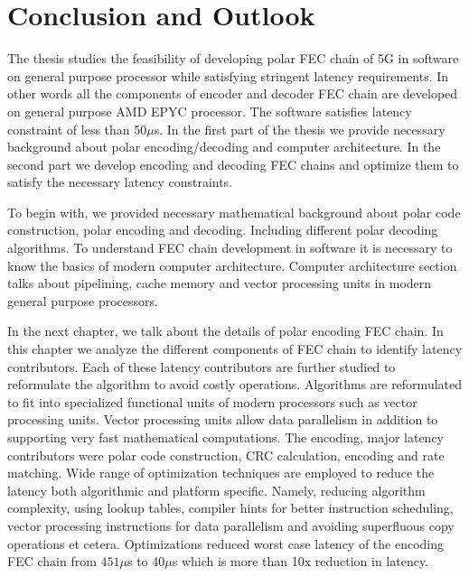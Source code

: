 \chapter{Conclusion and Outlook} \label{chap:conclusion}
The thesis studies the feasibility of developing polar FEC chain of 5G in software on general purpose processor while satisfying stringent latency requirements. In other words all the components of encoder and decoder FEC chain are developed on general purpose AMD EPYC processor. The software satisfies latency constraint of less than 50$\mu$s. In the first part of the thesis we provide necessary background about polar encoding/decoding and computer architecture. In the second part we develop encoding and decoding FEC chains and optimize them to satisfy the necessary latency constraints. \newline

To begin with, we provided necessary mathematical background about polar code construction, polar encoding and decoding. Including different polar decoding algorithms. To understand FEC chain development in software it is necessary to know the basics of modern computer architecture. Computer architecture section talks about pipelining, cache memory and vector processing units in modern general purpose processors. \newline

In the next chapter, we talk about the details of polar encoding FEC chain. In this chapter we analyze the different components of FEC chain to identify latency contributors. Each of these latency contributors are further studied to reformulate the algorithm to avoid costly operations. Algorithms are reformulated to fit into specialized functional units of modern processors such as vector processing units. Vector processing units allow data parallelism in addition to supporting very fast mathematical computations. The encoding,  major latency contributors were polar code construction, CRC calculation, encoding and rate matching. Wide range of optimization techniques are employed to reduce the latency both algorithmic and platform specific. Namely, reducing algorithm complexity, using lookup tables, compiler hints for better instruction scheduling, vector processing instructions for data parallelism and avoiding superfluous copy operations et cetera. Optimizations reduced worst case latency of the encoding FEC chain from $451 \mu$s to $40\mu$s which is more than 10x reduction in latency. \newline

